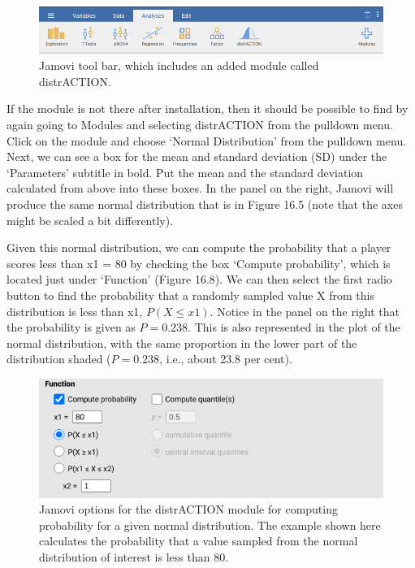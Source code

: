 \documentclass[
]{scrbook}
\begin{document}
\begin{figure}
\includegraphics[width=1\linewidth]{img/jamovi_toolbar_modules_distrACTION} \caption{Jamovi tool bar, which includes an added module called distrACTION.}\label{fig:unnamed-chunk-75}
\end{figure}

If the module is not there after installation, then it should be possible to find by again going to Modules and selecting distrACTION from the pulldown menu.
Click on the module and choose `Normal Distribution' from the pulldown menu.
Next, we can see a box for the mean and standard deviation (SD) under the `Parameters' subtitle in bold.
Put the mean and the standard deviation calculated from above into these boxes.
In the panel on the right, Jamovi will produce the same normal distribution that is in Figure 16.5 (note that the axes might be scaled a bit differently).

Given this normal distribution, we can compute the probability that a player scores less than x1 = 80 by checking the box `Compute probability', which is located just under `Function' (Figure 16.8).
We can then select the first radio button to find the probability that a randomly sampled value X from this distribution is less than x1, \(P(X \leq x1)\).
Notice in the panel on the right that the probability is given as \(P = 0.238\).
This is also represented in the plot of the normal distribution, with the same proportion in the lower part of the distribution shaded (\(P = 0.238\), i.e., about 23.8 per cent).

\begin{figure}
\includegraphics[width=0.8\linewidth]{img/jamovi_normal_distribution} \caption{Jamovi options for the distrACTION module for computing probability for a given normal distribution. The example shown here calculates the probability that a value sampled from the normal distribution of interest is less than 80.}\label{fig:unnamed-chunk-76}
\end{figure}
\end{document}
